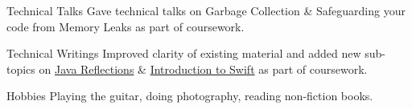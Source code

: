 


\begin{cvskills}


  \cvskill
  {Technical Talks}
  {Gave technical talks on Garbage Collection \& Safeguarding your code from Memory Leaks as part of coursework.}

  
  \cvskill
  {Technical Writings}
  {Improved clarity of existing material and added new sub-topics on \href{https://github.com/se-edu/learningresources/pull/30}{Java Reflections} \& \href{https://github.com/se-edu/learningresources/pull/31}{Introduction to Swift} \linebreak as part of coursework.}


  \cvskill
  {Hobbies}
  {Playing the guitar, doing photography, reading non-fiction books.}


\end{cvskills}